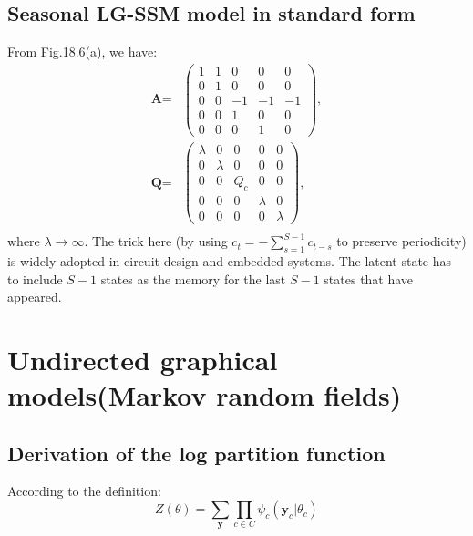 \documentclass[UTF8]{ctexart}
\begin{document}
\subsection{Seasonal LG-SSM model in standard form}
From Fig.18.6(a), we have:
$$
\begin{aligned}
\textbf{A}=&\begin{pmatrix}
1 & 1 & 0 & 0 & 0 \\
0 & 1 & 0 & 0 & 0 \\
0 & 0 & -1 & -1 & -1 \\
0 & 0 & 1 & 0 & 0 \\
0 & 0 & 0 & 1 & 0
\end{pmatrix}, \\
\textbf{Q}=&\begin{pmatrix}
\lambda & 0 & 0 & 0 & 0 \\
0 & \lambda & 0 & 0 & 0 \\
0 & 0 & Q_{c} & 0 & 0 \\
0 & 0 & 0 & \lambda & 0 \\
0 & 0 & 0 & 0 & \lambda
\end{pmatrix}, \\
\end{aligned}
$$
where $\lambda\rightarrow\infty$.
The trick here (by using $c_{t}=-\sum_{s=1}^{S-1}c_{t-s}$ to preserve periodicity) is widely adopted in circuit design and embedded systems.
The latent state has to include $S-1$ states as the memory for the last $S-1$ states that have appeared.  

\newpage
\section{Undirected graphical models(Markov random fields)}
\subsection{Derivation of the log partition function}
According to the definition:
$$Z(\theta)=\sum_{\textbf{y}}\prod_{c \in C}\psi_{c}(\textbf{y}_{c}|\theta_{c})$$
\end{document}
